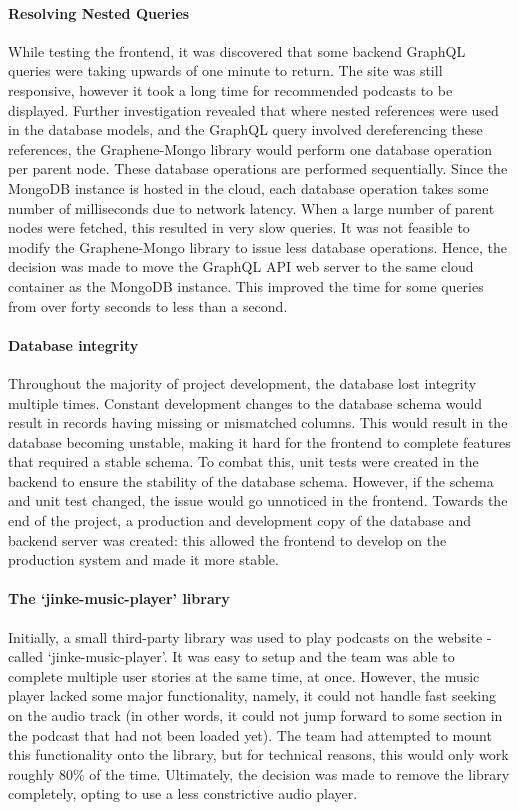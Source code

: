 \documentclass[../report.tex]{subfiles}
\begin{document}
\paragraph{Resolving Nested Queries}

While testing the frontend, it was discovered that some backend GraphQL queries were taking upwards of one minute to return.
The site was still responsive, however it took a long time for recommended podcasts to be displayed.
Further investigation revealed that where nested references were used in the database models, and the GraphQL query involved dereferencing these references, the Graphene-Mongo library would perform one database operation per parent node.
These database operations are performed sequentially.
Since the MongoDB instance is hosted in the cloud, each database operation takes some number of milliseconds due to network latency.
When a large number of parent nodes were fetched, this resulted in very slow queries.
It was not feasible to modify the Graphene-Mongo library to issue less database operations.
Hence, the decision was made to move the GraphQL API web server to the same cloud container as the MongoDB instance.
This improved the time for some queries from over forty seconds to less than a second.

\paragraph{Database integrity}

Throughout the majority of project development, the database lost integrity multiple times.
Constant development changes to the database schema would result in records having missing or mismatched columns.
This would result in the database becoming unstable, making it hard for the frontend to complete features that required a stable schema.
To combat this, unit tests were created in the backend to ensure the stability of the database schema.
However, if the schema and unit test changed, the issue would go unnoticed in the frontend.
Towards the end of the project, a production and development copy of the database and backend server was created: this allowed the frontend to develop on the production system and made it more stable.

\paragraph{The `jinke-music-player' library}

Initially, a small third-party library was used to play podcasts on the website - called `jinke-music-player'.
It was easy to setup and the team was able to complete multiple user stories at the same time, at once.
However, the music player lacked some major functionality, namely, it could not handle fast seeking on the audio track (in other words, it could not jump forward to some section in the podcast that had not been loaded yet).
The team had attempted to mount this functionality onto the library, but for technical reasons, this would only work roughly 80\% of the time.
Ultimately, the decision was made to remove the library completely, opting to use a less constrictive audio player.
\end{document}
